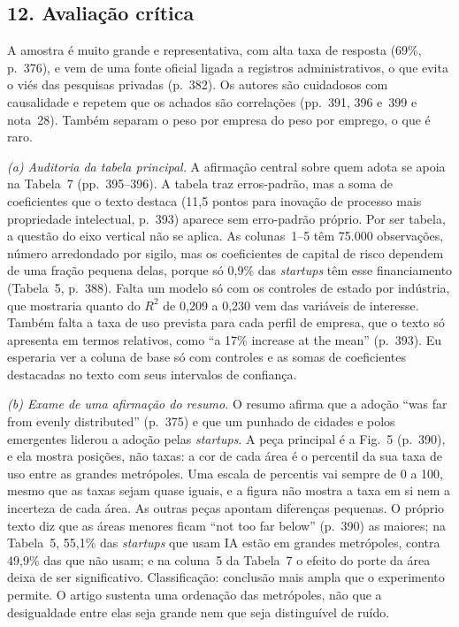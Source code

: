 \subsection*{12. Avaliação crítica}
A amostra é muito grande e representativa, com alta taxa de resposta (69\%, p.~376), e vem de uma
fonte oficial ligada a registros administrativos, o que evita o viés das pesquisas privadas
(p.~382). Os autores são cuidadosos com causalidade e repetem que os achados são correlações
(pp.~391, 396 e~399 e nota~28). Também separam o peso por empresa do peso por emprego, o que é raro.

\textit{(a) Auditoria da tabela principal.} A afirmação central sobre quem adota se apoia na
Tabela~7 (pp.~395--396). A tabela traz erros-padrão, mas a soma de coeficientes que o texto destaca
(11,5 pontos para inovação de processo mais propriedade intelectual, p.~393) aparece sem erro-padrão
próprio. Por ser tabela, a questão do eixo vertical não se aplica. As colunas~1--5 têm 75.000
observações, número arredondado por sigilo, mas os coeficientes de capital de risco dependem de uma
fração pequena delas, porque só 0,9\% das \emph{startups} têm esse financiamento (Tabela~5, p.~388).
Falta um modelo só com os controles de estado por indústria, que mostraria quanto do $R^2$ de 0,209
a 0,230 vem das variáveis de interesse. Também falta a taxa de uso prevista para cada perfil de
empresa, que o texto só apresenta em termos relativos, como ``a 17\% increase at the mean''
(p.~393). Eu esperaria ver a coluna de base só com controles e as somas de coeficientes destacadas
no texto com seus intervalos de confiança.

\textit{(b) Exame de uma afirmação do resumo.} O resumo afirma que a adoção ``was far from evenly
distributed'' (p.~375) e que um punhado de cidades e polos emergentes liderou a adoção pelas
\emph{startups}. A peça principal é a Fig.~5 (p.~390), e ela mostra posições, não taxas: a cor de
cada área é o percentil da sua taxa de uso entre as grandes metrópoles. Uma escala de percentis vai
sempre de 0 a 100, mesmo que as taxas sejam quase iguais, e a figura não mostra a taxa em si nem a
incerteza de cada área. As outras peças apontam diferenças pequenas. O próprio texto diz que as
áreas menores ficam ``not too far below'' (p.~390) as maiores; na Tabela~5, 55,1\% das
\emph{startups} que usam IA estão em grandes metrópoles, contra 49,9\% das que não usam; e na
coluna~5 da Tabela~7 o efeito do porte da área deixa de ser significativo. Classificação: conclusão
mais ampla que o experimento permite. O artigo sustenta uma ordenação das metrópoles, não que a
desigualdade entre elas seja grande nem que seja distinguível de ruído.
